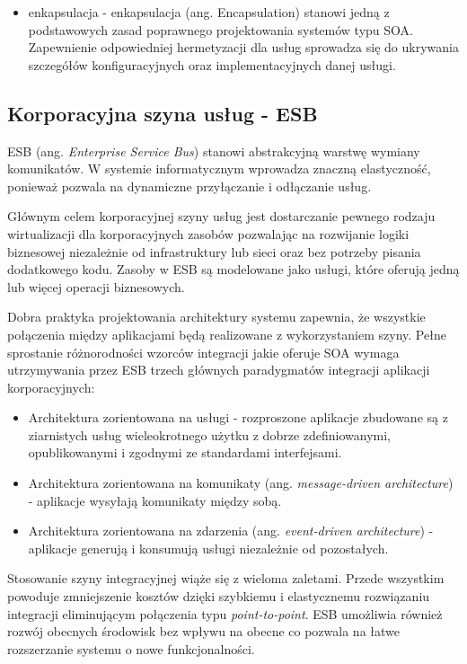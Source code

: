 \begin{itemize}
\item{enkapsulacja - enkapsulacja (ang. Encapsulation) stanowi jedną z podstawowych zasad poprawnego projektowania systemów typu SOA. Zapewnienie odpowiedniej hermetyzacji dla usług sprowadza się do ukrywania szczegółów konfiguracyjnych oraz implementacyjnych danej usługi.}
\end{itemize}

\subsection{Korporacyjna szyna usług - ESB}
ESB (ang. \textit{Enterprise Service Bus}) stanowi abstrakcyjną warstwę wymiany komunikatów. W systemie informatycznym wprowadza znaczną elastyczność, ponieważ pozwala na dynamiczne przyłączanie i odłączanie usług.\cite{PlatIntGor}

Głównym celem korporacyjnej szyny usług jest dostarczanie pewnego rodzaju wirtualizacji dla korporacyjnych zasobów pozwalając na rozwijanie logiki biznesowej niezależnie od infrastruktury lub sieci oraz bez potrzeby pisania dodatkowego kodu. Zasoby w ESB są modelowane jako usługi, które oferują jedną lub więcej operacji biznesowych.\cite{IBMRBSoaPat}

Dobra praktyka projektowania architektury systemu zapewnia, że wszystkie połączenia między aplikacjami będą realizowane z wykorzystaniem szyny.\cite{PlatIntGor} Pełne sprostanie różnorodności wzorców integracji jakie oferuje SOA wymaga utrzymywania przez ESB trzech głównych paradygmatów integracji aplikacji korporacyjnych:
\begin{itemize}
\item{Architektura zorientowana na usługi - rozproszone aplikacje zbudowane są z ziarnistych usług wieleokrotnego użytku z dobrze zdefiniowanymi, opublikowanymi i zgodnymi ze standardami interfejsami.}
\item{Architektura zorientowana na komunikaty (ang. \textit{message-driven architecture}) - aplikacje wysyłają komunikaty między sobą.}
\item{Architektura zorientowana na zdarzenia (ang. \textit{event-driven architecture}) - aplikacje generują i konsumują usługi niezależnie od pozostałych.} \cite{IBMRBSoaPat}
\end{itemize}

Stosowanie szyny integracyjnej wiąże się z wieloma zaletami. Przede wszystkim powoduje zmniejszenie kosztów dzięki szybkiemu i elastycznemu rozwiązaniu integracji eliminującym połączenia typu \textit{point-to-point}. ESB umożliwia również rozwój obecnych środowisk bez wpływu na obecne co pozwala na łatwe rozszerzanie systemu o nowe funkcjonalności.\cite{IBMRBSoaPat}

